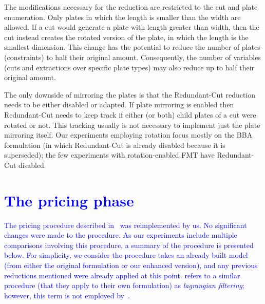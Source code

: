 \documentclass[ppgc,tese,english,formais,babel]{iiufrgs}
\newif\iffinalversion
\newcommand{\newtext}[1]{\iffinalversion%
#1%
\else%
\textcolor{blue}{#1}%
\fi%
}
\begin{document}
The modifications necessary for the reduction are restricted to the cut and plate enumeration.
Only plates in which the length is smaller than the width are allowed.
If a cut would generate a plate with length greater than width, then the cut instead creates the rotated version of the plate, in which the length is the smallest dimension.
This change has the potential to reduce the number of plates (constraints) to half their original amount.
Consequently, the number of variables (cuts and extractions over specific plate types) may also reduce up to half their original amount.

The only downside of mirroring the plates is that the Redundant-Cut reduction needs to be either disabled or adapted.
If plate mirroring is enabled then Redundant-Cut needs to keep track if either (or both) child plates of a cut were rotated or not.
This tracking usually is not necessary to implement just the plate mirroring itself.
Our experiments employing rotation focus mostly on the BBA formulation (in which Redundant-Cut is already disabled because it is superseded); the few experiments with rotation-enabled FMT have Redundant-Cut disabled.

\section{\newtext{The pricing phase}}
\label{sec:pricing}

\newtext{
The pricing procedure described in~\citet{furini:2016,dimitri_thesis} was reimplemented by us.
No significant changes were made to the procedure.
As our experiments include multiple comparisons involving this procedure, a summary of the procedure is presented below.
For simplicity, we consider the procedure takes an already built model (from either the original formulation or our enhanced version), and any previous reductions mentioned were already applied at this point.
\citet{clautiaux:2018} refers to a similar procedure (that they apply to their own formulation) as \emph{lagrangian filtering}; however, this term is not employed by~\citet{furini:2016,dimitri_thesis}.
}
\end{document}
